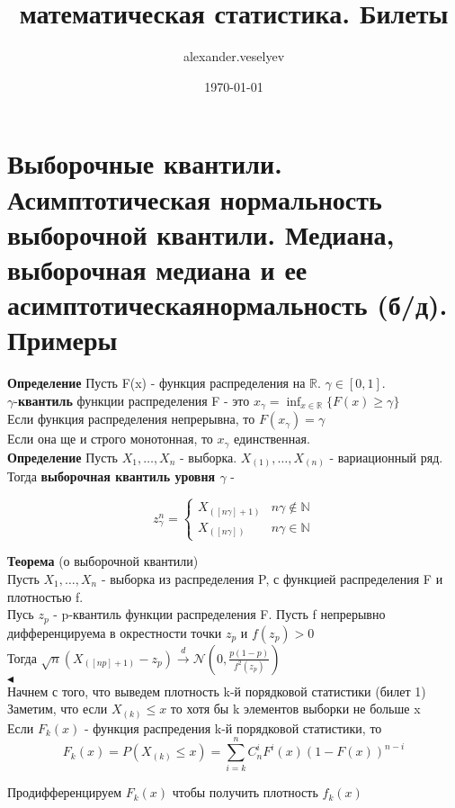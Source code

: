 \documentclass{article}
\title{математическая статистика. Билеты}
\author{alexander.veselyev }
\date{\today}
\begin{document}
\section{Выборочные квантили. Асимптотическая нормальность выборочной квантили. Медиана, выборочная медиана и ее асимптотическаянормальность (б/д). Примеры}

\textbf{Определение} Пусть F(x) - функция распределения на $\mathbb{R}$. $\gamma \in [0, 1]$.\\
$\gamma$-\textbf{квантиль} функции распределения F - это $x_\gamma = \inf_{x\in\mathbb{R}}\{F(x)\geq\gamma\}$\\
Если функция распределения непрерывна, то $F(x_\gamma) = \gamma$\\
Если она ще и строго монотонная, то $x_\gamma$ единственная.\\
\textbf{Определение} Пусть $X_1,\dots,X_n$ - выборка. $X_{(1)},\dots,X_{(n)}$ - вариационный ряд.\\
Тогда \textbf{выборочная квантиль уровня $\gamma$} - 



\begin{equation*}
z_\gamma^n =
	\begin{cases}
		X_{( [n\gamma] + 1)} & n\gamma\notin\mathbb{N}\\
		X_{([n\gamma])} & n\gamma\in\mathbb{N}
	\end{cases}
\end{equation*}

\textbf{Теорема} (о выборочной квантили)\\
Пусть $X_1,\dots,X_n$ - выборка из распределения P, с функцией распределения F и плотностью f.\\
Пусь $z_p$ - p-квантиль функции распределения F. Пусть f непрерывно дифференцируема в окрестности точки $z_p$ и $f(z_p) > 0$\\
Тогда $\sqrt{n}(X_{([np]+1)} - z_p) \xrightarrow{d} \mathcal{N}(0, \frac{p(1-p)}{f^2(z_p)})$\\
$\blacktriangleleft$\\
Начнем с того, что выведем плотность k-й порядковой статистики (билет 1)\\
Заметим, что если $X_{(k)}\leq x$ то хотя бы k элементов выборки не больше x\\
Если $F_k(x)$ - функция распредения k-й порядковой статистики, то
$$F_k(x) = P(X_{(k)} \leq x) = \sum_{i=k}^n{C_n^iF^i(x)(1-F(x))^{n-i}} $$

Продифференцируем $F_k(x)$ чтобы получить плотность $f_k(x)$
\end{document}
